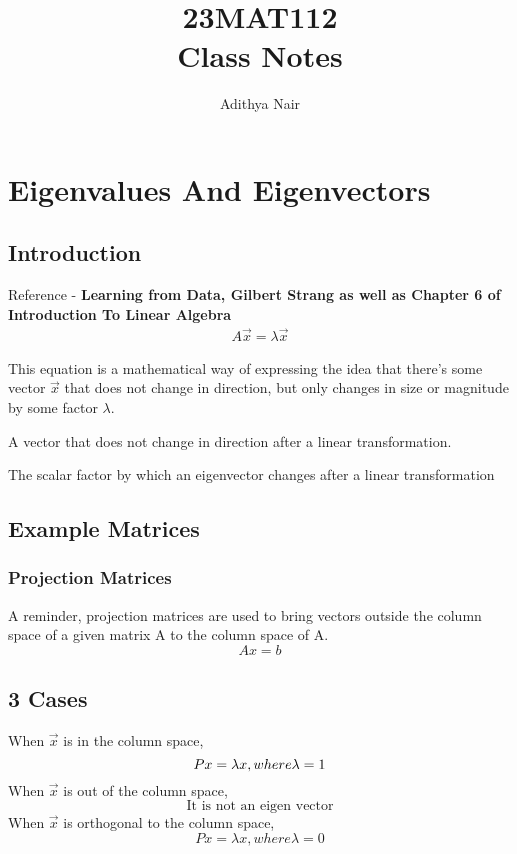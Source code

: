 \documentclass[twoside]{report}
\title{\Huge{23MAT112}\\ Class Notes}
\author{\huge{Adithya Nair}}
\date{}
\begin{document}
\maketitle
\newpage%
\tableofcontents
\chapter{Eigenvalues And Eigenvectors}
\section{Introduction} %
Reference - \textbf{Learning from Data, Gilbert Strang as well as Chapter 6 of Introduction To Linear Algebra}
\begin{align*}
	A \vec{x} = \lambda \vec{x}
\end{align*}

This equation is a mathematical way of expressing the idea that there's some vector $\vec{x}$ that does not change in direction, but only changes in size or magnitude by some factor $\lambda$.


\begin{definition}[Eigenvector]
   A vector that does not change in direction after a linear transformation.
\end{definition}
\begin{definition}[Eigenvalue]
The scalar factor by which an eigenvector changes after a linear transformation	
\end{definition}
\section{Example Matrices} %
\subsection{Projection Matrices}
A reminder, projection matrices are used to bring vectors outside the column space of a given matrix A to the column space of A.
\[
	Ax = b
\]
\section*{3 Cases}
When $\vec{x}$ is in the column space,
\[
	Px = \lambda x, where \\ \lambda = 1
\]
When $\vec{x}$ is out of the column space,
\[
   \text{It is not an eigen vector}
\]
When $\vec{x}$ is orthogonal to the column space,
\[
	Px = \lambda x, where \lambda = 0
\]
\end{document}

